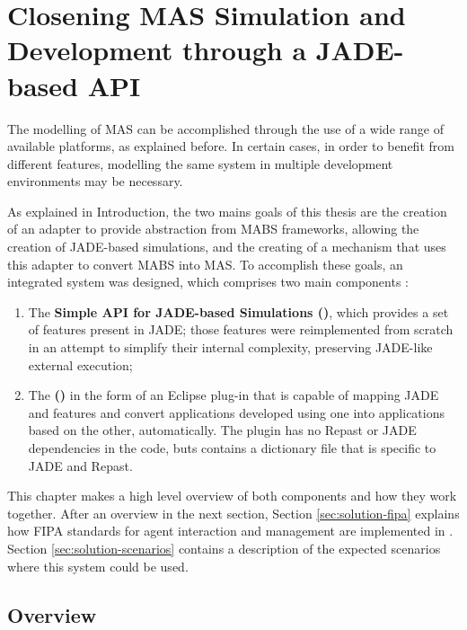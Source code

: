 \chapter{Closening MAS Simulation and Development through a JADE-based API}
\label{chap:solution}

The modelling of MAS can be accomplished through the use of a wide range of available platforms, as explained before. In certain cases, in order to benefit from different features, modelling the same system in multiple development environments may be necessary.

As explained in Introduction, the two mains goals of this thesis are the creation of an adapter to provide abstraction from MABS frameworks, allowing the creation of JADE-based simulations, and the creating of a mechanism that uses this adapter to convert MABS into MAS. To accomplish these goals, an integrated system was designed, which comprises two main components :

\begin{enumerate}
  \item The \textbf{Simple API for JADE-based Simulations (\apiname{})}, which provides a set of features present in JADE; those features were reimplemented from scratch in an attempt to simplify their internal complexity, preserving JADE-like external execution;
  \item The \textbf{\pluginname (\plugin)} in the form of an Eclipse plug-in that is capable of mapping JADE and \apiname{} features and convert applications developed using one into applications based on the other, automatically. The plugin has no Repast or JADE dependencies in the code, buts contains a dictionary file that is specific to JADE and Repast.
\end{enumerate}

This chapter makes a high level overview of both components and how they work together. After an overview in the next section, Section \ref{sec:solution-fipa} explains how FIPA standards for agent interaction and management are implemented in \apiname{}. Section \ref{sec:solution-scenarios} contains a description of the expected scenarios where this system could be used.

\section{Overview}
\label{sec:solution-overview}

